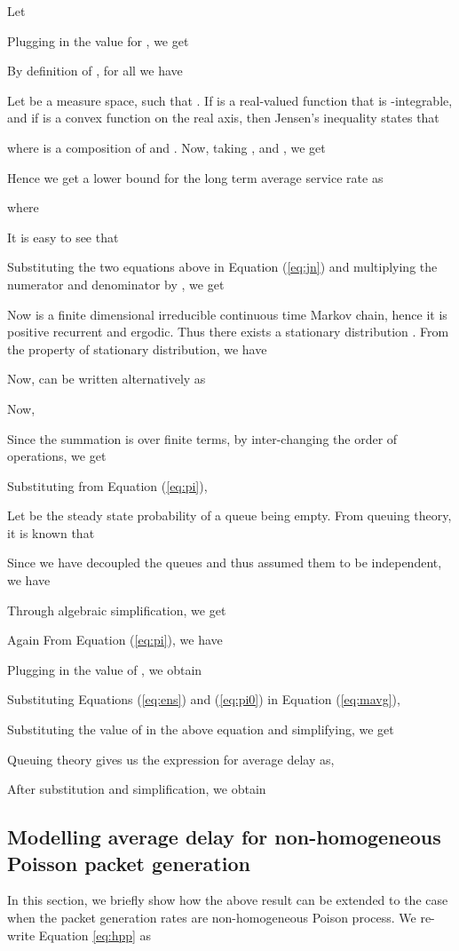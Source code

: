 \documentclass[10pt, conference, compsocconf]{IEEEtran}
\begin{document}
Let

Plugging in the value for , we get

By definition of , for all  we have

Let  be a measure space, such that . If  is a real-valued function that is -integrable, and if  is a convex function on the real axis, then Jensen's  inequality states that \cite{rudin}

where  is a composition of  and . Now, taking  ,  and , we get 

Hence we get a lower bound for the long term average service rate as

where 

It is easy to see that

Substituting the two equations above in Equation (\ref{eq:jn}) and multiplying the numerator and denominator by , we get

Now  is a finite dimensional irreducible continuous time Markov chain, hence it is positive recurrent and ergodic. Thus there exists a stationary distribution . From the property of stationary distribution, we have

Now,  can be written alternatively as


\noindent
Now, 

Since the summation is over finite terms, by inter-changing the order of operations, we get

Substituting from Equation (\ref{eq:pi}),


\noindent
Let  be the steady state probability of a queue being empty. From queuing theory, it is known that
 
Since we have decoupled the queues and thus assumed them to be independent, we have


Through algebraic simplification, we get

Again From Equation (\ref{eq:pi}), we have

Plugging in the value of , we obtain

Substituting Equations (\ref{eq:ens}) and (\ref{eq:pi0}) in Equation (\ref{eq:mavg}), 

Substituting the value of  in the above equation and simplifying, we get

Queuing theory gives us the expression for average delay as,

After substitution and simplification, we obtain


\subsection{Modelling average delay for non-homogeneous Poisson packet generation}
In this section, we briefly show how the above result can be extended to the case when the packet generation rates are non-homogeneous Poison process. We re-write Equation \ref{eq:hpp} as
 
\end{document}
